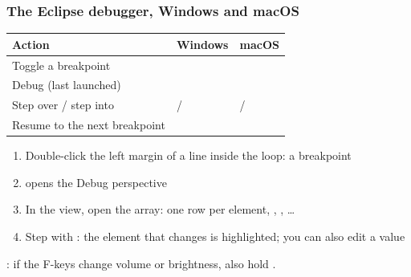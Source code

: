 \documentclass[aspectratio=169,10pt,compress]{beamer}
\begin{document}




\begin{frame}[t,fragile] \frametitle{The Eclipse debugger, Windows and macOS}


\begin{table}
		\footnotesize
		\begin{tabular}{@{}L{0.34\textwidth}L{0.24\textwidth}L{0.30\textwidth}@{}}
			\toprule
			\textbf{Action} & \textbf{Windows} & \textbf{macOS} \\
			\midrule
			Toggle a breakpoint     &    &  \\
			Debug (last launched)   &                 &  \\
			Step over / step into   &  /      &  /  \\
			Resume to the next breakpoint &            &  \\
			\bottomrule
		\end{tabular}
\end{table}%


	\begin{enumerate}\small
		\item Double-click the left margin of a line inside the loop: a breakpoint
		\item {} opens the Debug perspective
		\item In the  view, open the array: one row per element, \hCode{[0]}, \hCode{[1]}, \dots
		\item Step with : the element that changes is highlighted; you can also edit a value
	\end{enumerate}
	\footnotesize {}: if the F-keys change volume or brightness, also hold .
\end{frame}




\end{document}
